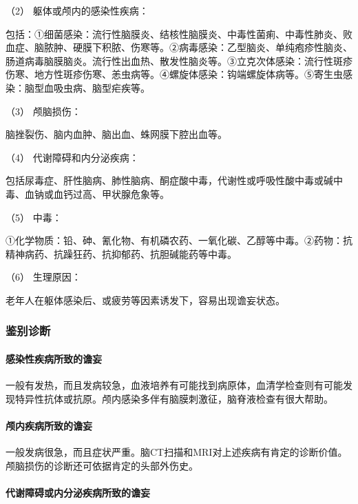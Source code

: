 \hypertarget{text00044.htmlux5cux23CHP1-18-2-1-3-2}{}
（2） 躯体或颅内的感染性疾病：

包括：①细菌感染：流行性脑膜炎、结核性脑膜炎、中毒性菌痢、中毒性肺炎、败血症、脑脓肿、硬膜下积脓、伤寒等。②病毒感染：乙型脑炎、单纯疱疹性脑炎、肠道病毒脑膜脑炎。流行性出血热、散发性脑炎等。③立克次体感染：流行性斑疹伤寒、地方性斑疹伤寒、恙虫病等。④螺旋体感染：钩端螺旋体病等。⑤寄生虫感染：脑型血吸虫病、脑型疟疾等。

\hypertarget{text00044.htmlux5cux23CHP1-18-2-1-3-3}{}
（3） 颅脑损伤：

脑挫裂伤、脑内血肿、脑出血、蛛网膜下腔出血等。

\hypertarget{text00044.htmlux5cux23CHP1-18-2-1-3-4}{}
（4） 代谢障碍和内分泌疾病：

包括尿毒症、肝性脑病、肺性脑病、酮症酸中毒，代谢性或呼吸性酸中毒或碱中毒、血钠或血钙过高、甲状腺危象等。

\hypertarget{text00044.htmlux5cux23CHP1-18-2-1-3-5}{}
（5） 中毒：

①化学物质：铅、砷、氰化物、有机磷农药、一氧化碳、乙醇等中毒。②药物：抗精神病药、抗躁狂药、抗抑郁药、抗胆碱能药等中毒。

\hypertarget{text00044.htmlux5cux23CHP1-18-2-1-3-6}{}
（6） 生理原因：

老年人在躯体感染后、或疲劳等因素诱发下，容易出现谵妄状态。

\subsubsection{鉴别诊断}

\paragraph{感染性疾病所致的谵妄}

一般有发热，而且发病较急，血液培养有可能找到病原体，血清学检查则有可能发现特异性抗体或抗原。颅内感染多伴有脑膜刺激征，脑脊液检查有很大帮助。

\paragraph{颅内疾病所致的谵妄}

一般发病很急，而且症状严重。脑CT扫描和MRI对上述疾病有肯定的诊断价值。颅脑损伤的诊断还可依据肯定的头部外伤史。

\paragraph{代谢障碍或内分泌疾病所致的谵妄}


